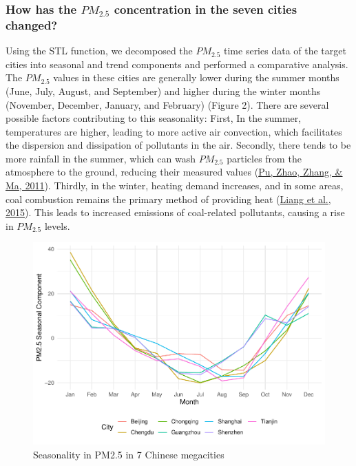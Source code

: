 \documentclass[
  12pt,
]{article}
\begin{document}
\hypertarget{how-has-the-pm_2.5-concentration-in-the-seven-cities-changed}{%
\subsubsection{\texorpdfstring{How has the \(PM_{2.5}\) concentration in
the seven cities
changed?}{How has the PM\_\{2.5\} concentration in the seven cities changed?}}\label{how-has-the-pm_2.5-concentration-in-the-seven-cities-changed}}

Using the STL function, we decomposed the \(PM_{2.5}\) time series data
of the target cities into seasonal and trend components and performed a
comparative analysis. The \(PM_{2.5}\) values in these cities are
generally lower during the summer months (June, July, August, and
September) and higher during the winter months (November, December,
January, and February) (Figure 2). There are several possible factors
contributing to this seasonality: First, In the summer, temperatures are
higher, leading to more active air convection, which facilitates the
dispersion and dissipation of pollutants in the air. Secondly, there
tends to be more rainfall in the summer, which can wash \(PM_{2.5}\)
particles from the atmosphere to the ground, reducing their measured
values (\protect\hyperlink{ref-rain}{Pu, Zhao, Zhang, \& Ma, 2011}).
Thirdly, in the winter, heating demand increases, and in some areas,
coal combustion remains the primary method of providing heat
(\protect\hyperlink{ref-heating}{Liang et al., 2015}). This leads to
increased emissions of coal-related pollutants, causing a rise in
\(PM_{2.5}\) levels.

\begin{figure}
\centering
\includegraphics{LiFangRenZhang_ENV872_Project_files/figure-latex/seasonal figure-1.pdf}
\caption{Seasonality in PM2.5 in 7 Chinese megacities}
\end{figure}
\end{document}
